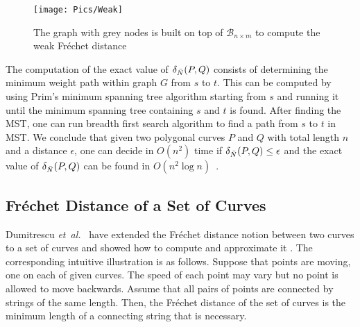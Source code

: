 \documentclass[12pt]{dalthesis}
\newcommand{\etal}{{\em et~al.\/}}
\newcommand{\CB}{{\mathscr B}}
\newcommand{\Frechet}{Fr\'echet }
\newcommand{\BNM}{\CB_{n \times m}}
\begin{document}
\begin{figure}[t]
	\centering
	\texttt{[image: Pics/Weak]}
	\caption{ The graph with grey nodes is built on top of $\BNM$ to compute the weak \Frechet distance}
	\label{fig:weak}
\end{figure}



The computation of the exact value of $\delta_{\bar{N}}(P,Q)$ consists of 
determining the minimum weight path within graph $G$ from $s$ to $t$.
This can be computed by using Prim's minimum spanning tree 
algorithm starting from $s$ and running it until the minimum spanning tree 
containing $s$ and $t$ is found. 
After finding 
the MST, one can run breadth first search algorithm to find 
a path from $s$ to $t$ in MST.  
We conclude that 
given two polygonal curves $P$ and $Q$ with total length $n$ and a distance $\epsilon$,
one can decide in $O(n^2)$ time if $\delta_{\bar{N}}(P,Q) \le \epsilon$ and 
the exact value of $\delta_{\bar{N}}(P,Q)$ can be found in $O(n^2 \log n)$~\cite{AltG95}. 









\subsection{\Frechet Distance of a Set of Curves}
Dumitrescu \etal~\cite{SetofCurves} have extended the \Frechet distance 
notion between two curves to a set of curves and showed how to compute and approximate it .
The corresponding intuitive illustration is as follows. 
Suppose that points are moving, one on each of	given curves. 
The speed of each point may vary but no point is allowed to move backwards. 
Assume that all pairs of points are connected by strings of the same length. 
Then, the \Frechet distance of the set of curves is the minimum length of a connecting string that is necessary.
\end{document}
